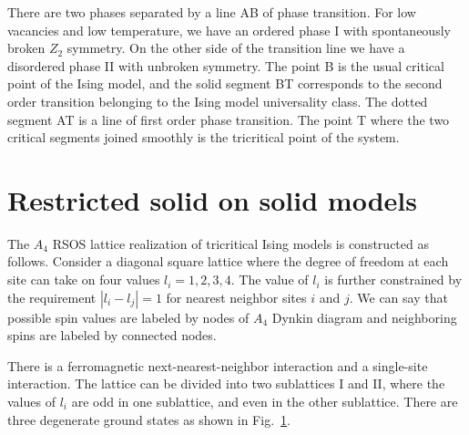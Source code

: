 \documentclass[12pt]{article}
\begin{document}
 There are two phases
separated by a line AB of phase transition. For low vacancies and low
temperature, we have an ordered phase I with spontaneously broken $Z_2$
symmetry. On the other side of the transition line we have a disordered
phase II with unbroken symmetry. The point B is the usual critical point
of the Ising model, and the solid segment BT corresponds to the second
order transition belonging to the Ising model universality class. The
dotted segment AT is a line of first order phase transition. The point T
where the two critical segments joined smoothly is the tricritical point of the
system. 


\section{Restricted solid on solid models}
\label{sec:restr-solid-solid}

The $A_4$ RSOS lattice realization of tricritical Ising models is constructed as follows.
Consider a diagonal square lattice where the degree of
freedom at each site can take on four values $l_i = 1, 2, 3, 4$.
The value of $l_i$ is further constrained by the requirement
$|l_i-l_j| = 1$ for nearest neighbor sites $i$ and $j$. We can say
that possible spin values are labeled by nodes of $A_4$ Dynkin
diagram and neighboring spins are labeled by connected nodes.

There is a ferromagnetic next-nearest-neighbor interaction and a
single-site interaction. The lattice can be divided into two sublattices
I and II, where the values of $l_i$ are odd in one sublattice, and
even in the other sublattice. There are three degenerate
ground states as shown in Fig.~\ref{fig:vacua}.
\begin{figure}[h]
  \label{fig:vacua}
\end{figure}
\end{document}
